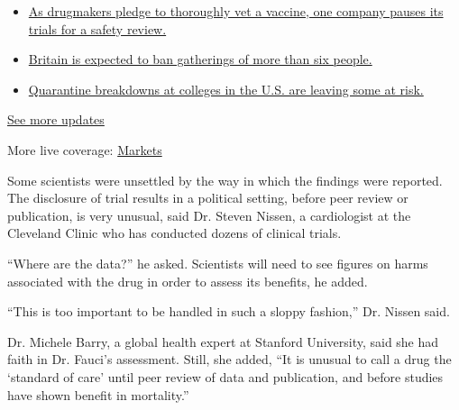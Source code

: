 \begin{itemize}
\tightlist
\item
  \href{https://www.nytimes3xbfgragh.onion/2020/09/09/world/covid-19-coronavirus.html?action=click\&pgtype=Article\&state=default\&region=MAIN_CONTENT_1\&context=storylines_live_updates\#link-70cea8bb}{As
  drugmakers pledge to thoroughly vet a vaccine, one company pauses its
  trials for a safety review.}
\item
  \href{https://www.nytimes3xbfgragh.onion/2020/09/09/world/covid-19-coronavirus.html?action=click\&pgtype=Article\&state=default\&region=MAIN_CONTENT_1\&context=storylines_live_updates\#link-780eaa2f}{Britain
  is expected to ban gatherings of more than six people.}
\item
  \href{https://www.nytimes3xbfgragh.onion/2020/09/09/world/covid-19-coronavirus.html?action=click\&pgtype=Article\&state=default\&region=MAIN_CONTENT_1\&context=storylines_live_updates\#link-11cec4c0}{Quarantine
  breakdowns at colleges in the U.S. are leaving some at risk.}
\end{itemize}

\href{https://www.nytimes3xbfgragh.onion/2020/09/09/world/covid-19-coronavirus.html?action=click\&pgtype=Article\&state=default\&region=MAIN_CONTENT_1\&context=storylines_live_updates}{See
more updates}

More live coverage:
\href{https://www.nytimes3xbfgragh.onion/live/2020/09/09/business/stock-market-today-coronavirus?action=click\&pgtype=Article\&state=default\&region=MAIN_CONTENT_1\&context=storylines_live_updates}{Markets}

Some scientists were unsettled by the way in which the findings were
reported. The disclosure of trial results in a political setting, before
peer review or publication, is very unusual, said Dr. Steven Nissen, a
cardiologist at the Cleveland Clinic who has conducted dozens of
clinical trials.

``Where are the data?'' he asked. Scientists will need to see figures on
harms associated with the drug in order to assess its benefits, he
added.

``This is too important to be handled in such a sloppy fashion,'' Dr.
Nissen said.

Dr. Michele Barry, a global health expert at Stanford University, said
she had faith in Dr. Fauci's assessment. Still, she added, ``It is
unusual to call a drug the `standard of care' until peer review of data
and publication, and before studies have shown benefit in mortality.''

